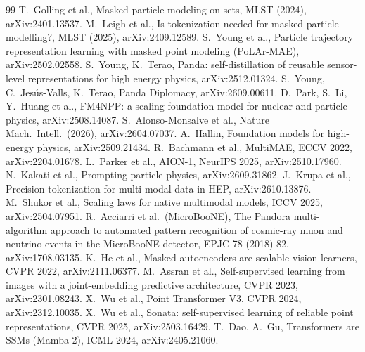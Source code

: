 \documentclass[11pt,a4paper]{article}
\begin{document}
\begin{thebibliography}{99}\small
{} T.~Golling et al., Masked particle modeling on sets, MLST (2024), arXiv:2401.13537.
 M.~Leigh et al., Is tokenization needed for masked particle modelling?, MLST (2025), arXiv:2409.12589.
 S.~Young et al., Particle trajectory representation learning with masked point modeling (PoLAr-MAE), arXiv:2502.02558.
 S.~Young, K.~Terao, Panda: self-distillation of reusable sensor-level representations for high energy physics, arXiv:2512.01324.
 S.~Young, C.~Jes\'us-Valls, K.~Terao, Panda Diplomacy, arXiv:2609.00611.
 D.~Park, S.~Li, Y.~Huang et al., FM4NPP: a scaling foundation model for nuclear and particle physics, arXiv:2508.14087.
 S.~Alonso-Monsalve et al., Nature Mach.\ Intell.\ (2026), arXiv:2604.07037.
 A.~Hallin, Foundation models for high-energy physics, arXiv:2509.21434.
 R.~Bachmann et al., MultiMAE, ECCV 2022, arXiv:2204.01678.
 L.~Parker et al., AION-1, NeurIPS 2025, arXiv:2510.17960.
 N.~Kakati et al., Prompting particle physics, arXiv:2609.31862.
 J.~Krupa et al., Precision tokenization for multi-modal data in HEP, arXiv:2610.13876.
 M.~Shukor et al., Scaling laws for native multimodal models, ICCV 2025, arXiv:2504.07951.
 R.~Acciarri et al.\ (MicroBooNE), The Pandora multi-algorithm approach to automated pattern recognition of cosmic-ray muon and neutrino events in the MicroBooNE detector, EPJC 78 (2018) 82, arXiv:1708.03135.
 K.~He et al., Masked autoencoders are scalable vision learners, CVPR 2022, arXiv:2111.06377.
 M.~Assran et al., Self-supervised learning from images with a joint-embedding predictive architecture, CVPR 2023, arXiv:2301.08243.
 X.~Wu et al., Point Transformer V3, CVPR 2024, arXiv:2312.10035.
 X.~Wu et al., Sonata: self-supervised learning of reliable point representations, CVPR 2025, arXiv:2503.16429.
 T.~Dao, A.~Gu, Transformers are SSMs (Mamba-2), ICML 2024, arXiv:2405.21060.
\end{thebibliography}
\end{document}
